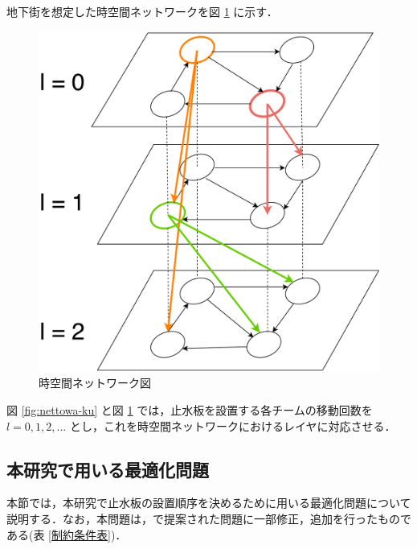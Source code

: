 \documentclass[a4paper,12pt,fleqn]{jarticle}
\begin{document}
地下街を想定した時空間ネットワークを図 \ref{fig:zikuukann} に示す．
\begin{figure}[H]
  \centering
  \includegraphics[keepaspectratio,scale=0.4]{nettowaku.pdf}
  \caption{時空間ネットワーク図}
  \label{fig:zikuukann}
\end{figure}

図 \ref{fig:nettowa-ku} と図 \ref{fig:zikuukann} では，止水板を設置する各チームの移動回数を $l=0,1,2,...$ とし，これを時空間ネットワークにおけるレイヤに対応させる．

\newpage


\subsection{本研究で用いる最適化問題}
本節では，本研究で止水板の設置順序を決めるために用いる最適化問題について説明する．なお，本問題は，\cite{馬谷さん卒論}で提案された問題に一部修正，追加を行ったものである(表 \ref{制約条件表})．
\end{document}

